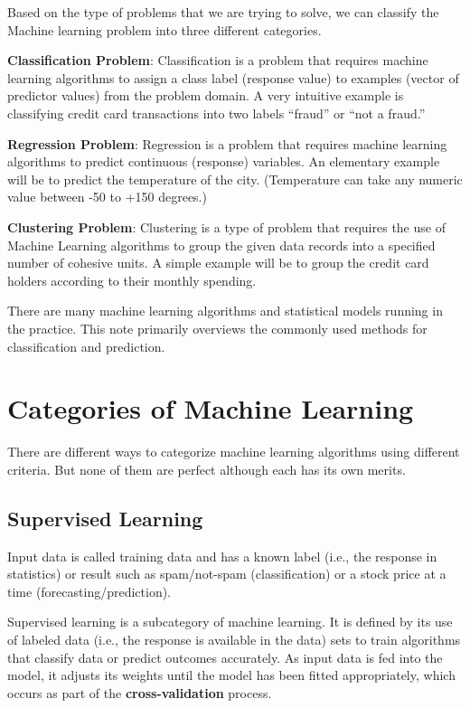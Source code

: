 \documentclass[
]{book}
\begin{document}
Based on the type of problems that we are trying to solve, we can classify the Machine learning problem into three different categories.

\textbf{Classification Problem}: Classification is a problem that requires machine learning algorithms to assign a class label (response value) to examples (vector of predictor values) from the problem domain. A very intuitive example is classifying credit card transactions into two labels ``fraud'' or ``not a fraud.''

\textbf{Regression Problem}: Regression is a problem that requires machine learning algorithms to predict continuous (response) variables. An elementary example will be to predict the temperature of the city. (Temperature can take any numeric value between -50 to +150 degrees.)

\textbf{Clustering Problem}: Clustering is a type of problem that requires the use of Machine Learning algorithms to group the given data records into a specified number of cohesive units. A simple example will be to group the credit card holders according to their monthly spending.

There are many machine learning algorithms and statistical models running in the practice. This note primarily overviews the commonly used methods for classification and prediction.

\hfill\break

\hypertarget{categories-of-machine-learning}{%
\section{Categories of Machine Learning}\label{categories-of-machine-learning}}

There are different ways to categorize machine learning algorithms using different criteria. But none of them are perfect although each has its own merits.

\hypertarget{supervised-learning}{%
\subsection{Supervised Learning}\label{supervised-learning}}

Input data is called training data and has a known label (i.e., the response in statistics) or result such as spam/not-spam (classification) or a stock price at a time (forecasting/prediction).

Supervised learning is a subcategory of machine learning. It is defined by its use of labeled data (i.e., the response is available in the data) sets to train algorithms that classify data or predict outcomes accurately. As input data is fed into the model, it adjusts its weights until the model has been fitted appropriately, which occurs as part of the \textbf{cross-validation} process.
\end{document}
